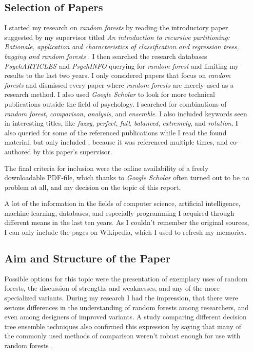 \documentclass[a4paper,man,12pt,apacite]{apa6} %
\begin{document}
\subsection{Selection of Papers}
I started my research on \emph{random forests} by reading the
introductory paper suggested by my supervisor titled
\emph{An introduction to recursive partitioning: Rationale, application
and characteristics of classification and regression trees, bagging and
random forests} \cite{strobl2009introduction}.
I then searched the research databases \emph{PsychARTICLES} and
\emph{PsychINFO} querying for \emph{random forest} and limiting my results
to the last two years.
I only considered papers that focus on \emph{random forests} and
dismissed every paper where \emph{random forests} are merely used as a
research method.
I also used \emph{Google Scholar} to look for more technical
publications outside the field of psychology.
I searched for combinations of \emph{random forest}, \emph{comparison},
\emph{analysis}, and \emph{ensemble}.
I also included keywords seen in interesting titles, like \emph{fuzzy},
\emph{perfect}, \emph{full}, \emph{balanced}, \emph{extremely}, and
\emph{rotation}.
I also queried for some of the referenced publications while I read the
found material, but only included \cite{strobl2008conditional}, because
it was referenced multiple times, and co-authored by this paper's
supervisor.

The final criteria for inclusion were the online availability of a freely
downloadable PDF-file, which thanks to \emph{Google Scholar} often turned
out to be no problem at all, and my decision on the topic of
this report.

A lot of the information in the fields of computer science, artificial
intelligence, machine learning, databases, and especially programming
I acquired through different means in the last ten years.
As I couldn't remember the original sources, I can only include the pages
on Wikipedia, which I used to refresh my memories.

\subsection{Aim and Structure of the Paper}
Possible options for this topic were the presentation of
exemplary uses of random
forests, the discussion of strengths and weaknesses, and any of the more
specialized variants.
During my research I had the impression, that there were serious
differences in the understanding of random forests among researchers,
and even among designers of improved variants.
A study comparing different decision tree ensemble techniques also confirmed
this expression by saying that many of the commonly used methods of comparison
weren't robust enough for use with random forests \cite{banfield2007comparison}.
\end{document}
